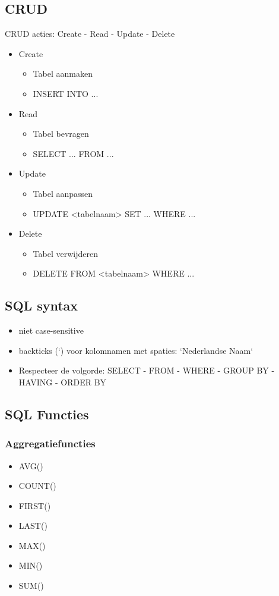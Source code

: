 \documentclass{article}
\begin{document}
\subsection{CRUD}
CRUD acties: Create - Read - Update - Delete 
\begin{itemize}
    \item Create
    \begin{itemize}
        \item Tabel aanmaken
        \item INSERT INTO ...
    \end{itemize}
    \item Read
    \begin{itemize}
        \item Tabel bevragen
        \item SELECT ... FROM ...
    \end{itemize}
    \item Update
    \begin{itemize}
        \item Tabel aanpassen
        \item UPDATE <tabelnaam> SET ... WHERE ...
    \end{itemize}
    \item Delete
    \begin{itemize}
        \item Tabel verwijderen
        \item DELETE FROM <tabelnaam> WHERE ...
    \end{itemize} 
\end{itemize}

\subsection{SQL syntax}
\begin{itemize}
    \item niet case-sensitive
    \item backticks (`) voor kolomnamen met spaties: `Nederlandse Naam`
    \item Respecteer de volgorde: SELECT - FROM - WHERE - GROUP BY - HAVING - ORDER BY
\end{itemize}

\subsection{SQL Functies}

\subsubsection{Aggregatiefuncties}
\begin{itemize}
    \item AVG()
    \item COUNT() 
    \item FIRST()
    \item LAST()
    \item MAX()
    \item MIN()
    \item SUM()
\end{itemize}
\end{document}
